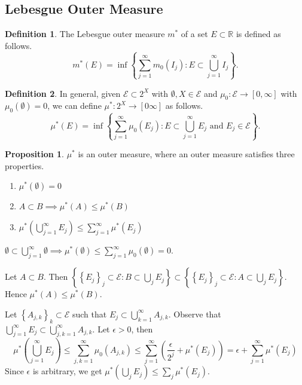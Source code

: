 \documentclass[11pt]{article}
\theoremstyle{definition}
\newtheorem{defn}{Definition}[section]
\newtheorem{prop}{Proposition}[section]
\newcommand{\set}[1]{\left\{ #1 \right\}}
\newcommand{\RR}{\mathbb{R}}
\newcommand{\m}[1]{\mathcal{#1}}
\begin{document}

\subsection{Lebesgue Outer Measure}

\begin{defn}
    The Lebesgue outer measure $m^*$ of a set $E\subset\RR$ is defined as follows. 
    \[
        m^*(E) = \inf\set{\sum_{j=1}^\infty m_0(I_j):E\subset\bigcup_{j=1}^\infty I_j}.
    \]
\end{defn}

\begin{defn}
    In general, given $\m{E}\subset2^X$ with $\emptyset,X\in\m{E}$ and
    $\mu_0:\m{E}\to[0,\infty]$ with $\mu_0(\emptyset)=0$, we can define
    $\mu^*:2^X\to[0\infty]$ as follows.
    \[
        \mu^*(E) = \inf\set{\sum_{j=1}^\infty \mu_0(E_j):E\subset\bigcup_{j=1}^\infty E_j
        \text{ and } E_j\in\m{E}}.
    \]
\end{defn}

\begin{prop}
    $\mu^*$ is an outer measure, where an outer measure satisfies three properties.
    \begin{enumerate}
        \item $\mu^*(\emptyset)=0$
        \item $A\subset B \implies \mu^*(A)\le\mu^*(B)$
        \item $\mu^*\left(\bigcup_{j=1}^\infty E_j\right) \le \sum_{j=1}^\infty\mu^*(E_j)$
    \end{enumerate}
\end{prop}

\proof[Proof of 1.]
$\emptyset\subset\bigcup_{j=1}^\infty\emptyset \implies
\mu^*(\emptyset)\le\sum_{j=1}^\infty\mu_0(\emptyset)=0$.
\qedhere

\proof[Proof of 2.]
Let $A\subset B$. Then $\set{\set{E_j}_j\subset\m{E}:B\subset\bigcup_j E_j} \subset
\set{\set{E_j}_j\subset\m{E}:A\subset\bigcup_j E_j}$. Hence $\mu^*(A)\le\mu^*(B)$. 
\qedhere

\proof[Proof of 3.]
Let $\set{A_{j,k}}_k \subset \m{E}$ such that $E_j \subset \bigcup_{k=1}^\infty A_{j,k}$.
Observe that $\bigcup_{j=1}^\infty E_j \subset \bigcup_{j,k=1}^\infty A_{j,k}$. Let
$\epsilon > 0$, then
\[
    \mu^*\left(\bigcup_{j=1}^\infty E_j\right)
    \le \sum_{j,k=1}^\infty \mu_0(A_{j,k})
    \le \sum_{j=1}^\infty \left(\frac\epsilon{2^j}+\mu^*(E_j)\right)
    = \epsilon + \sum_{j=1}^\infty \mu^*(E_j)
\]
Since $\epsilon$ is arbitrary, we get $\mu^*(\bigcup_j E_j) \le \sum_j \mu^*(E_j)$. 
\qedhere
\end{document}
